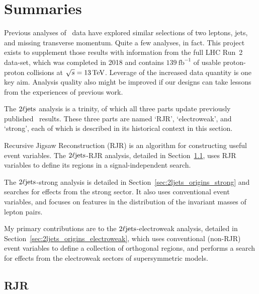 \clearpage
\FloatBarrier
\section{Summaries}
\label{sec:2ljets_context}
Previous analyses of \atlas\ data have explored similar selections of
two leptons, jets, and missing transverse momentum.
Quite a few analyses, in fact.
This project exists to supplement those results with information from the full
LHC Run~2 data-set, which was completed in 2018 and contains
$139~\mathrm{fb}^{-1}$ of usable proton-proton collisions at
$\sqrt{s} = 13\,\eV[T]$.
Leverage of the increased data quantity is one key aim.
Analysis quality also might be improved if our designs can take lessons from
the experiences of previous work.

The $\twoljets$ analysis is a trinity,
of which all three parts update previously published \atlas\ results.
These three parts are named `RJR', `electroweak', and `strong', each of which
is described in its historical context in this section.

Recursive Jigsaw Reconstruction (RJR) is an algorithm for constructing useful
event variables.
The $\twoljets$-RJR analysis, detailed in Section~\ref{sec:2ljets_origins_rjr},
uses RJR variables to define its regions in a signal-independent search.

The $\twoljets$-strong analysis is
detailed in Section~\ref{sec:2ljets_origins_strong} and
searches for effects from the strong sector.
It also uses conventional event variables, and focuses on features in the
distribution of the invariant masses of lepton pairs.

My primary contributions are to the $\twoljets$-electroweak analysis,
detailed in Section~\ref{sec:2ljets_origins_electroweak},
which uses conventional (non-RJR) event variables to define a collection of
orthogonal regions, and performs a search for effects from the electroweak
sectors of supersymmetric models.

\FloatBarrier
\subsection{RJR}
\label{sec:2ljets_origins_rjr}

